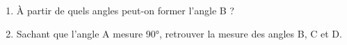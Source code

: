 \begin{activite}
\begin{changemargin}{-10mm}{-15mm}
\begin{enumerate}
            \par\smallskip\pointilles\par\smallskip
            \item À partir de quels angles peut-on former l'angle B ? \pointilles
            \item Sachant que l'angle A mesure \ang{90}, retrouver la mesure des angles B, C et D.
            \par\smallskip\pointilles
            \par\smallskip\pointilles
            \par\smallskip\pointilles
        \end{enumerate}
    \end{changemargin}
    \vspace*{-20mm}
 \end{activite} 
 